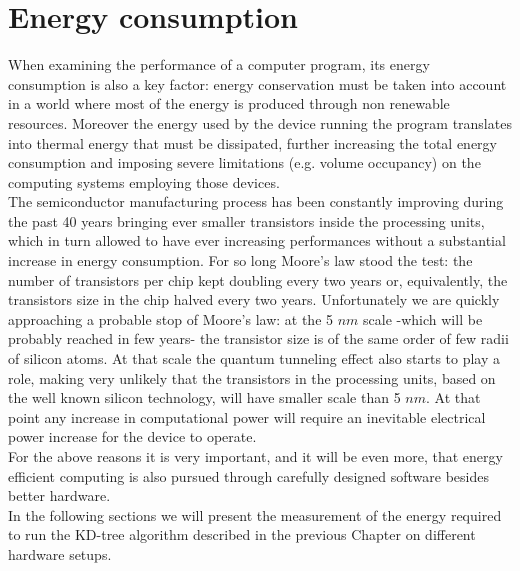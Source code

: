 \chapter{Energy consumption}\label{ch:power}
When examining the performance of a computer program, its energy consumption is also a key factor: energy conservation must be taken into account in a world where most of the energy is produced through non renewable resources. Moreover the energy used by the device running the program translates into thermal energy that must be dissipated, further increasing the total energy consumption and imposing severe limitations (e.g. volume occupancy) on the computing systems employing those devices.\\
The semiconductor manufacturing process has been constantly improving during the past 40 years bringing ever smaller transistors inside the processing units, which in turn allowed to have ever increasing performances without a substantial increase in energy consumption. For so long Moore's law stood the test: the number of transistors per chip kept doubling every two years or, equivalently, the transistors size in the chip halved every two years.
Unfortunately we are quickly approaching a probable stop of Moore's law: at the 5 $\unit{nm}$ scale -which will be probably reached in few years- the transistor size is of the same order of few radii of silicon atoms. At that scale the quantum tunneling effect also starts to play a role, making very unlikely that the transistors in the processing units, based on the well known silicon technology, will have smaller scale than 5 $\unit{nm}$. At that point any increase in computational power will require an inevitable electrical power increase for the device to operate.\\
For the above reasons it is very important, and it will be even more, that energy efficient computing is also pursued through carefully designed software besides better hardware.\\
In the following sections we will present the measurement of the energy required to run the KD-tree algorithm described in the previous Chapter on different hardware setups.


